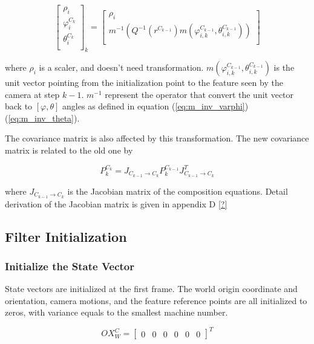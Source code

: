 \begin{equation}
\begin{bmatrix}
\rho_{i} \\
\varphi_{i}^{C_{k}} \\
\theta_{i}^{C_{k}} \\
\end{bmatrix}_{k}=
\begin{bmatrix}
\rho _{i} \\
m^{-1}\left(Q^{-1}(r^{C_{k-1}})m(\varphi _{i, k}^{C_{k-1}}, \theta _{i, k}^{C_{k-1}})\right) \\
\end{bmatrix}
\end{equation}

\noindent where $\rho_i$ is a scaler, and doesn't need transformation.
$m(\varphi_{i, k}^{C_{k-1}}, \theta_{i, k}^{C_{k-1}})$ is the unit
vector pointing from the initialization point to the feature seen by
the camera at step $k-1$. $m^{-1}$ represent the operator that convert
the unit vector back to $[\varphi, \theta]$ angles as defined in
equation (\ref{eq:m_inv_varphi}) (\ref{eq:m_inv_theta}).

The covariance matrix is also affected by this transformation. The new
covariance matrix is related to the old one by

\begin{equation}
P_{k}^{C_{k}}=J_{C_{k-1}\to C_{k}}P_{k}^{C_{k-1}}J_{C_{k-1}\to C_{k}}^{T}
\end{equation}

\noindent where $J_{C_{k-1} \to C_k}$ is the Jacobian matrix of the
composition equations. Detail derivation of the Jacobian matrix is
given in appendix D \ref{?}  

\subsection{Filter Initialization}
\subsubsection{Initialize the State Vector}

State vectors are initialized at the first frame. The world origin 
coordinate and orientation, camera motions, and the feature reference 
points are all initialized to zeros, with variance equals to the 
smallest machine number. 

\begin{equation}
\label{eq:OX_init}
OX_{W}^{C}=\begin{bmatrix}0&0&0&0&0&0\end{bmatrix}^T 
\end{equation}

